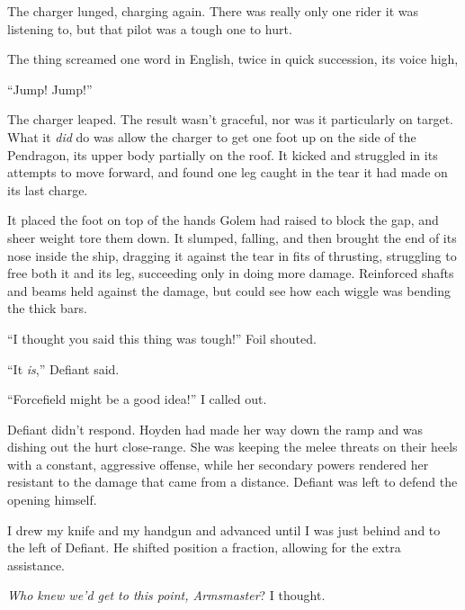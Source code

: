 The charger lunged, charging again.  There was really only one rider it was listening to, but that pilot was a tough one to hurt.



The thing screamed one word in English, twice in quick succession, its voice high,



``Jump!  Jump!''



The charger leaped.  The result wasn't graceful, nor was it particularly on target.  What it \emph{did} do was allow the charger to get one foot up on the side of the Pendragon, its upper body partially on the roof.  It kicked and struggled in its attempts to move forward, and found one leg caught in the tear it had made on its last charge.



It placed the foot on top of the hands Golem had raised to block the gap, and sheer weight tore them down.  It slumped, falling, and then brought the end of its nose inside the ship, dragging it against the tear in fits of thrusting, struggling to free both it and its leg, succeeding only in doing more damage.  Reinforced shafts and beams held against the damage, but could see how each wiggle was bending the thick bars.



``I thought you said this thing was tough!''  Foil shouted.



``It \emph{is},'' Defiant said.



``Forcefield might be a good idea!''  I called out.



Defiant didn't respond.  Hoyden had made her way down the ramp and was dishing out the hurt close-range.  She was keeping the melee threats on their heels with a constant, aggressive offense, while her secondary powers rendered her resistant to the damage that came from a distance.  Defiant was left to defend the opening himself.



I drew my knife and my handgun and advanced until I was just behind and to the left of Defiant\emph{.  }He shifted position a fraction, allowing for the extra assistance.



\emph{Who knew we'd get to this point, Armsmaster}?  I thought.



